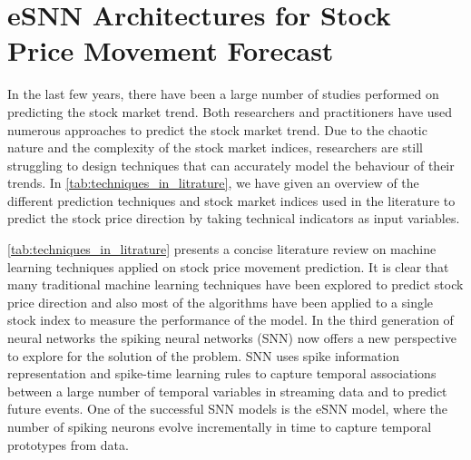 
\chapter{eSNN Architectures for Stock Price Movement Forecast}
\label{app:eSNN_stock}

In the last few years, there have been a large number of studies performed on predicting the stock market trend. Both researchers and practitioners have used numerous approaches to predict the stock market trend. Due to the chaotic nature and the complexity of the stock market indices, researchers are still struggling to design techniques that can accurately model the behaviour of their trends. In \tablename \ref{tab:techniques_in_litrature}, we have given an overview of the different prediction techniques and stock market indices used in the literature to predict the stock price direction by taking technical indicators as input variables. 

\tablename \ref{tab:techniques_in_litrature} presents a concise literature review on machine learning techniques applied on stock price movement prediction. It is clear that many traditional machine learning techniques have been explored to predict stock price direction and also most of the algorithms have been applied to a single stock index to measure the performance of the model. In the third generation of neural networks the spiking neural networks (SNN) now offers a new perspective to explore for the solution of the problem. SNN uses spike information representation and spike-time learning rules to capture temporal associations between a large number of temporal variables in streaming data and to predict future events. One of the successful SNN models is the eSNN model, where the number of spiking neurons evolve incrementally in time to capture temporal prototypes from data.  

